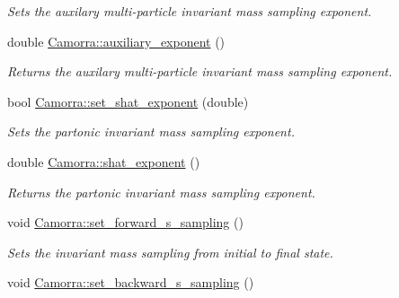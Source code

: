 \begin{DoxyCompactItemize}
\begin{DoxyCompactList}\small\item\em Sets the auxilary multi-\/particle invariant mass sampling exponent. \end{DoxyCompactList}\item 
\hypertarget{a00829_ae2574c2de709f48846ef66865357b28c}{
double \hyperlink{a00829_ae2574c2de709f48846ef66865357b28c}{Camorra::auxiliary\_\-exponent} ()}
\label{a00829_ae2574c2de709f48846ef66865357b28c}

\begin{DoxyCompactList}\small\item\em Returns the auxilary multi-\/particle invariant mass sampling exponent. \end{DoxyCompactList}\item 
\hypertarget{a00829_ad0de9bcec15b40b19cf2f7d8989781bf}{
bool \hyperlink{a00829_ad0de9bcec15b40b19cf2f7d8989781bf}{Camorra::set\_\-shat\_\-exponent} (double)}
\label{a00829_ad0de9bcec15b40b19cf2f7d8989781bf}

\begin{DoxyCompactList}\small\item\em Sets the partonic invariant mass sampling exponent. \end{DoxyCompactList}\item 
\hypertarget{a00829_aa340a7a07cd22c94638bcce39532a92b}{
double \hyperlink{a00829_aa340a7a07cd22c94638bcce39532a92b}{Camorra::shat\_\-exponent} ()}
\label{a00829_aa340a7a07cd22c94638bcce39532a92b}

\begin{DoxyCompactList}\small\item\em Returns the partonic invariant mass sampling exponent. \end{DoxyCompactList}\item 
\hypertarget{a00829_a93bc134d10fecad8d03b8479ffdf2ed2}{
void \hyperlink{a00829_a93bc134d10fecad8d03b8479ffdf2ed2}{Camorra::set\_\-forward\_\-s\_\-sampling} ()}
\label{a00829_a93bc134d10fecad8d03b8479ffdf2ed2}

\begin{DoxyCompactList}\small\item\em Sets the invariant mass sampling from initial to final state. \end{DoxyCompactList}\item 
\hypertarget{a00829_a0c39e77b66bcd1fa3e16a4f7693e47f6}{
void \hyperlink{a00829_a0c39e77b66bcd1fa3e16a4f7693e47f6}{Camorra::set\_\-backward\_\-s\_\-sampling} ()}
\label{a00829_a0c39e77b66bcd1fa3e16a4f7693e47f6}


\end{DoxyCompactItemize}
